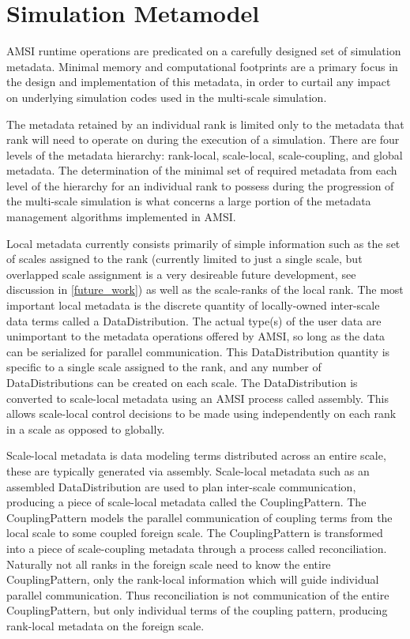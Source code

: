 \documentclass[11pt]{article}
\begin{document}
\section{Simulation Metamodel}\label{meta_model}
AMSI runtime operations are predicated on a carefully designed set of simulation metadata. Minimal memory and computational footprints are a primary focus in the design and implementation of this metadata, in order to curtail any impact on underlying simulation codes used in the multi-scale simulation. 

The metadata retained by an individual rank is limited only to the metadata that rank will need to operate on during the execution of a simulation. There are four levels of the metadata hierarchy: rank-local, scale-local, scale-coupling, and global metadata. The determination of the minimal set of required metadata from each level of the hierarchy for an individual rank to possess during the progression of the multi-scale simulation is what concerns a large portion of the metadata management algorithms implemented in AMSI.

Local metadata currently consists primarily of simple information such as the set of scales assigned to the rank (currently limited to just a single scale, but overlapped scale assignment is a very desireable future development, see discussion in \ref{future_work}) as well as the scale-ranks of the local rank. The most important local metadata is the discrete quantity of locally-owned inter-scale data terms called a DataDistribution. The actual type(s) of the user data are unimportant to the metadata operations offered by AMSI, so long as the data can be serialized for parallel communication. This DataDistribution quantity is specific to a single scale assigned to the rank, and any number of DataDistributions can be created on each scale. The DataDistribution is converted to scale-local metadata using an AMSI process called assembly. This allows scale-local control decisions to be made using independently on each rank in a scale as opposed to globally. 

Scale-local metadata is data modeling terms distributed across an entire scale, these are typically generated via assembly. Scale-local metadata such as an assembled DataDistribution are used to plan inter-scale communication, producing a piece of scale-local metadata called the CouplingPattern. The CouplingPattern models the parallel communication of coupling terms from the local scale to some coupled foreign scale. The CouplingPattern is transformed into a piece of scale-coupling metadata through a process called reconciliation. Naturally not all ranks in the foreign scale need to know the entire CouplingPattern, only the rank-local information which will guide individual parallel communication. Thus reconciliation is not communication of the entire CouplingPattern, but only individual terms of the coupling pattern, producing rank-local metadata on the foreign scale.
\end{document}
